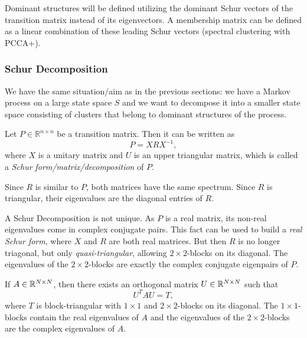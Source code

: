 Dominant structures will be defined utilizing the dominant Schur vectors
of the transition matrix instead of its eigenvectors.
A membership matrix can be defined as a linear combination of these leading Schur vectors (spectral clustering with PCCA+).


\subsubsection*{Schur Decomposition}

We have the same situation/aim as in the previous sections: we have a Markov process on a large state space $S$ and we want to decompose it into a smaller state space consisting of clusters that belong to dominant structures of the process.


\begin{defi}
Let $P \in \mathbb{R}^{n \times n}$ be a transition matrix. Then it can be written as
\begin{equation*}
P = XRX^{-1},
\end{equation*}
where $X$ is a unitary matrix and $U$ is an upper triangular matrix, which is called a \textit{Schur form/matrix/decomposition} of $P$.
\end{defi}

Since $R$ is similar to $P$, both matrices have the same spectrum. Since $R$ is triangular, their eigenvalues are the diagonal entries of $R$.

A Schur Decomposition is not unique. 
As $P$ is a real matrix, its non-real eigenvalues come in complex conjugate pairs. This fact can be used to build a \textit{real Schur form}, where $X$ and $R$ are both real matrices. But then $R$ is no longer triagonal, but only \textit{quasi-triangular}, allowing $2 \times 2$-blocks on its diagonal. 
The eigenvalues of the $2\times 2$-blocks are exactly the complex conjugate eigenpairs of $P$. 

\begin{thm}
If $A \in \mathbb{R}^{N \times N}$, then there exists an orthogonal matrix $U \in \mathbb{R}^{N \times N}$ such that
\begin{equation*}
U^TAU = T,
\end{equation*}
where $T$ is block-triangular with $1 \times 1$ and $2 \times 2$-blocks on its diagonal. The $1 \times 1$-blocks contain the real eigenvalues of $A$ and the eigenvalues of the $2 \times 2$-blocks are the complex eigenvalues of $A$.
\end{thm}


